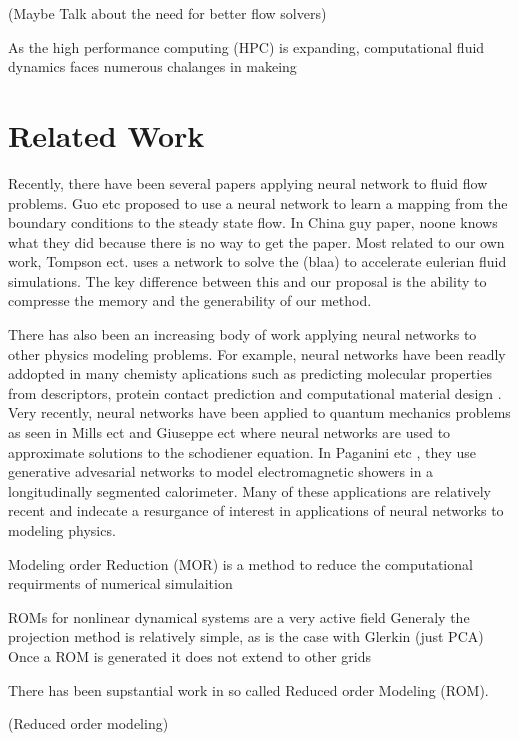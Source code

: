 \documentclass{article}
\begin{document}
(Maybe Talk about the need for better flow solvers)

As the high performance computing (HPC) is expanding, computational fluid dynamics faces numerous chalanges in makeing 


\section{Related Work}

Recently, there have been several papers applying neural network to fluid flow problems. Guo etc \cite{guo2016convolutional} proposed to use a neural network to learn a mapping from the boundary conditions to the steady state flow. In China guy paper, noone knows what they did because there is no way to get the paper. Most related to our own work, Tompson ect. \cite{tompson2016accelerating} uses a network to solve the (blaa) to accelerate eulerian fluid simulations. The key difference between this and our proposal is the ability to compresse the memory and the generability of our method.

There has also been an increasing body of work applying neural networks to other physics modeling problems. For example, neural networks have been readly addopted in many chemisty aplications such as predicting molecular properties from descriptors, protein contact prediction and computational material design \cite{goh2017deep}. Very recently, neural networks have been applied to quantum mechanics problems as seen in Mills ect \cite{mills2017deep} and Giuseppe ect \cite{carleo2017solving} where neural networks are used to approximate solutions to the schodiener equation. In Paganini etc \cite{2017arXiv170502355P}, they use generative advesarial networks \cite{goodfellow2014generative} to model electromagnetic showers in a longitudinally segmented calorimeter. Many of these applications are relatively recent and indecate a resurgance of interest in applications of neural networks to modeling physics.

Modeling order Reduction (MOR) is a method to reduce the computational requirments of numerical simulaition

ROMs for nonlinear dynamical systems are a very active field
Generaly the projection method is relatively simple, as is the case with Glerkin (just PCA)
Once a ROM is generated it does not extend to other grids

There has been supstantial work in so called Reduced order Modeling (ROM).

(Reduced order modeling)
\end{document}
